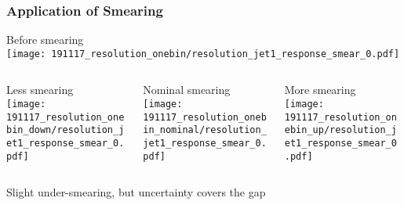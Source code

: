 \documentclass{beamer}
\begin{document}
\begin{frame}

  \frametitle{Application of Smearing}

  \centering

  Before smearing \\
  \texttt{[image: 191117\_resolution\_onebin/resolution\_jet1\_response\_smear\_0.pdf]}

  \vfill

  \begin{columns}
    \begin{column}{0.33\linewidth}
      \centering
      Less smearing \\
      \texttt{[image: 191117\_resolution\_onebin\_down/resolution\_jet1\_response\_smear\_0.pdf]}
    \end{column}
    \begin{column}{0.33\linewidth}
      \centering
      Nominal smearing \\
      \texttt{[image: 191117\_resolution\_onebin\_nominal/resolution\_jet1\_response\_smear\_0.pdf]}
    \end{column}
    \begin{column}{0.33\linewidth}
      \centering
      More smearing \\
      \texttt{[image: 191117\_resolution\_onebin\_up/resolution\_jet1\_response\_smear\_0.pdf]}
    \end{column}
  \end{columns}

  \vfill
  Slight under-smearing, but uncertainty covers the gap

\end{frame}
\end{document}
